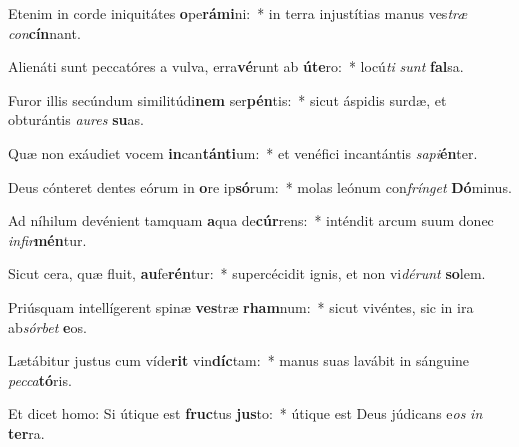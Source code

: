 \item Etenim in corde iniquitátes \textbf{o}pe\textbf{rá}\textbf{mi}ni:~* in terra injustítias manus ves\textit{træ} \textit{con}\textbf{cín}nant.
\item Alienáti sunt peccatóres a vulva, erra\textbf{vé}runt ab \textbf{ú}\textbf{te}ro:~* locú\textit{ti} \textit{sunt} \textbf{fal}sa.
\item Furor illis secúndum similitúdi\textbf{nem} ser\textbf{pén}tis:~* sicut áspidis surdæ, et obturántis \textit{au}\textit{res} \textbf{su}as.
\item Quæ non exáudiet vocem \textbf{in}can\textbf{tán}\textbf{ti}um:~* et venéfici incantántis \textit{sa}\textit{pi}\textbf{én}ter.
\item Deus cónteret dentes eórum in \textbf{o}re ip\textbf{só}rum:~* molas leónum con\textit{frín}\textit{get} \textbf{Dó}minus.
\item Ad níhilum devénient tamquam \textbf{a}qua de\textbf{cúr}rens:~* inténdit arcum suum donec \textit{in}\textit{fir}\textbf{mén}tur.
\item Sicut cera, quæ fluit, \textbf{au}fe\textbf{rén}tur:~* supercécidit ignis, et non vi\textit{dé}\textit{runt} \textbf{so}lem.
\item Priúsquam intellígerent spinæ \textbf{ves}træ \textbf{rham}num:~* sicut vivéntes, sic in ira ab\textit{sór}\textit{bet} \textbf{e}os.
\item Lætábitur justus cum víde\textbf{rit} vin\textbf{díc}tam:~* manus suas lavábit in sánguine \textit{pec}\textit{ca}\textbf{tó}ris.
\item Et dicet homo: Si útique est \textbf{fruc}tus \textbf{jus}to:~* útique est Deus júdicans e\textit{os} \textit{in} \textbf{ter}ra.
